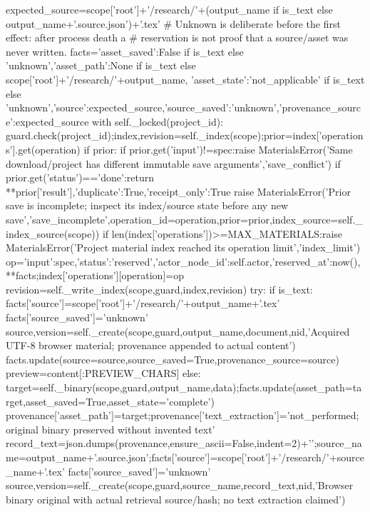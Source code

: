         expected_source=scope['root']+'/research/'+(output_name if is_text else output_name+'.source.json')+'.tex'
        # Unknown is deliberate before the first effect: after process death a
        # reservation is not proof that a source/asset was never written.
        facts={'asset_saved':False if is_text else 'unknown','asset_path':None if is_text else scope['root']+'/research/'+output_name,
            'asset_state':'not_applicable' if is_text else 'unknown','source':expected_source,'source_saved':'unknown','provenance_source':expected_source}
        with self._locked(project_id):
            guard.check(project_id);index,revision=self._index(scope);prior=index['operations'].get(operation)
            if prior:
                if prior.get('input')!=spec:raise MaterialsError('Same download/project has different immutable save arguments','save_conflict')
                if prior.get('status')=='done':return {**prior['result'],'duplicate':True,'receipt_only':True}
                raise MaterialsError('Prior save is incomplete; inspect its index/source state before any new save','save_incomplete',operation_id=operation,prior=prior,index_source=self._index_source(scope))
            if len(index['operations'])>=MAX_MATERIALS:raise MaterialsError('Project material index reached its operation limit','index_limit')
            op={'input':spec,'status':'reserved','actor_node_id':self.actor,'reserved_at':now(),**facts};index['operations'][operation]=op
            revision=self._write_index(scope,guard,index,revision)
            try:
                if is_text:
                    facts['source']=scope['root']+'/research/'+output_name+'.tex'
                    facts['source_saved']='unknown'
                    source,version=self._create(scope,guard,output_name,document,nid,'Acquired UTF-8 browser material; provenance appended to actual content')
                    facts.update(source=source,source_saved=True,provenance_source=source)
                    preview=content[:PREVIEW_CHARS]
                else:
                    target=self._binary(scope,guard,output_name,data);facts.update(asset_path=target,asset_saved=True,asset_state='complete')
                    provenance['asset_path']=target;provenance['text_extraction']='not_performed; original binary preserved without invented text'
                    record_text=json.dumps(provenance,ensure_ascii=False,indent=2)+'\n';source_name=output_name+'.source.json';facts['source']=scope['root']+'/research/'+source_name+'.tex'
                    facts['source_saved']='unknown'
                    source,version=self._create(scope,guard,source_name,record_text,nid,'Browser binary original with actual retrieval source/hash; no text extraction claimed')
